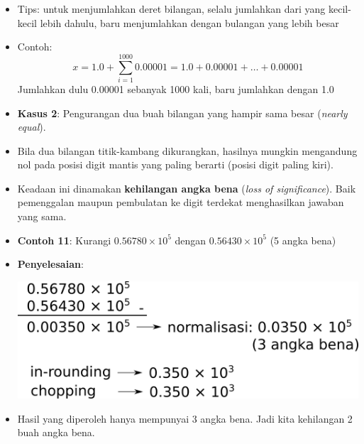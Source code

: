 \documentclass[pdflatex,compress]{beamer}
\begin{document}
\begin{frame}
	\begin{itemize}
		\item Tips: untuk menjumlahkan deret bilangan, selalu jumlahkan dari yang kecil-kecil lebih dahulu, baru menjumlahkan dengan bulangan yang lebih besar
		\item Contoh: \[ x = 1.0 + \sum_{i=1}^1000 0.00001 = 1.0 + 0.00001 + \dots + 0.00001 \]
		Jumlahkan dulu 0.00001 sebanyak 1000 kali, baru jumlahkan dengan 1.0
	\end{itemize}
\end{frame}

\begin{frame}
	\begin{itemize}
		\item \textbf{Kasus 2}: Pengurangan dua buah bilangan yang hampir sama besar (\textit{nearly equal}).
		\item Bila dua bilangan titik-kambang dikurangkan, hasilnya mungkin mengandung nol pada posisi digit mantis yang paling berarti (posisi digit paling kiri).
		\item Keadaan ini dinamakan \textbf{kehilangan angka bena} (\textit{loss of significance}). Baik pemenggalan maupun pembulatan ke digit terdekat menghasilkan jawaban yang sama.
	\end{itemize}
\end{frame}

\begin{frame}
	\begin{itemize}
		\item \textbf{Contoh 11}: Kurangi $ 0.56780 \times 10^5 $ dengan $ 0.56430 \times 10^5 $ (5 angka bena)
		\item[] \textbf{Penyelesaian}:
		\begin{center}
			\includegraphics[width=0.8\linewidth]{img/img105.png}
		\end{center}
		\item[] Hasil yang diperoleh hanya mempunyai 3 angka bena. Jadi kita kehilangan 2 buah angka bena.
	\end{itemize}
\end{frame}
\end{document}
